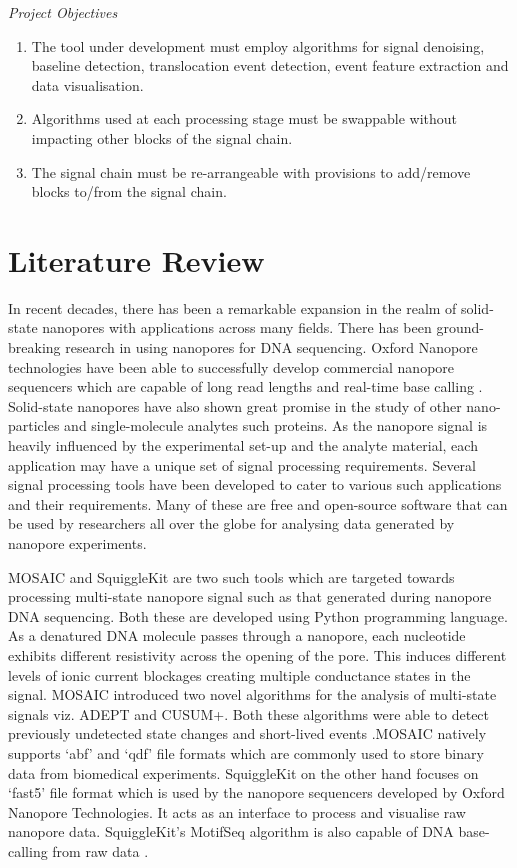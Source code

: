\documentclass[journal]{IEEEtran}
\begin{document}
\noindent \textit{Project Objectives}
\begin{enumerate}
\item {The tool under development must employ algorithms for signal denoising, baseline detection, translocation event detection, event feature extraction and data visualisation.}
\item {Algorithms used at each processing stage must be swappable without impacting other blocks of the signal chain.}
\item {The signal chain must be re-arrangeable with provisions to add/remove blocks to/from the signal chain.}
\end{enumerate}

\section{Literature Review}
In recent decades, there has been a remarkable expansion in the realm of solid-state nanopores with applications across many fields. There has been ground-breaking research in using nanopores for DNA sequencing. Oxford Nanopore technologies have been able to successfully develop commercial nanopore sequencers which are capable of long read lengths and real-time base calling \cite{ipMinIONAnalysisReference2015}. Solid-state nanopores have also shown great promise in the study of other nano-particles and single-molecule analytes such proteins. As the nanopore signal is heavily influenced by the experimental set-up and the analyte material, each application may have a unique set of signal processing requirements. Several signal processing tools have been developed to cater to various such applications and their requirements. Many of these are free and open-source software that can be used by researchers all over the globe for analysing data generated by nanopore experiments.

MOSAIC \cite{forstaterMOSAICModularSingleMolecule2016} and SquiggleKit \cite{fergusonSquiggleKitToolkitManipulating2019} are two such tools which are targeted towards processing multi-state nanopore signal such as that generated during nanopore DNA sequencing. Both these are developed using Python programming language. As a denatured DNA molecule passes through a nanopore, each nucleotide exhibits different resistivity across the opening of the pore. This induces different levels of ionic current blockages creating multiple conductance states in the signal. MOSAIC introduced two novel algorithms for the analysis of multi-state signals viz. ADEPT and CUSUM+. Both these algorithms were able to detect previously undetected state changes and short-lived events \cite{forstaterMOSAICModularSingleMolecule2016}.MOSAIC natively supports ‘abf’ and ‘qdf’ file formats which are commonly used to store binary data from biomedical experiments. SquiggleKit on the other hand focuses on ‘fast5’ file format which is used by the nanopore sequencers developed by Oxford Nanopore Technologies. It acts as an interface to process and visualise raw nanopore data. SquiggleKit’s MotifSeq algorithm is also capable of DNA base-calling from raw data \cite{fergusonSquiggleKitToolkitManipulating2019}.
\end{document}
